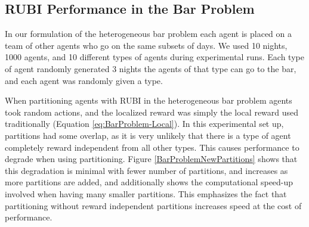 \documentclass[letterpaper]{article}
\begin{document}

\subsection{RUBI Performance in the Bar Problem}

In our formulation of the heterogeneous bar problem each agent is placed on a team of other agents who go on the same subsets of days. We used 10 nights, 1000 agents, and 10 different types of agents during experimental runs. Each type of agent randomly generated 3 nights the agents of that type can go to the bar, and each agent was randomly given a type. %

When partitioning agents with RUBI in the heterogeneous bar problem agents took random actions, and the localized reward was simply the local reward used traditionally (Equation \ref{eq:BarProblem-Local}). In this experimental set up, partitions had some overlap, as it is very unlikely that there is a type of agent completely reward independent from all other types. This causes performance to degrade when using partitioning. Figure \ref{BarProblemNewPartitions} shows that this degradation is minimal with fewer number of partitions, and increases as more partitions are added, and additionally shows the computational speed-up involved when having many smaller partitions. This emphasizes the fact that partitioning without reward independent partitions increases speed at the cost of performance.
\end{document}
